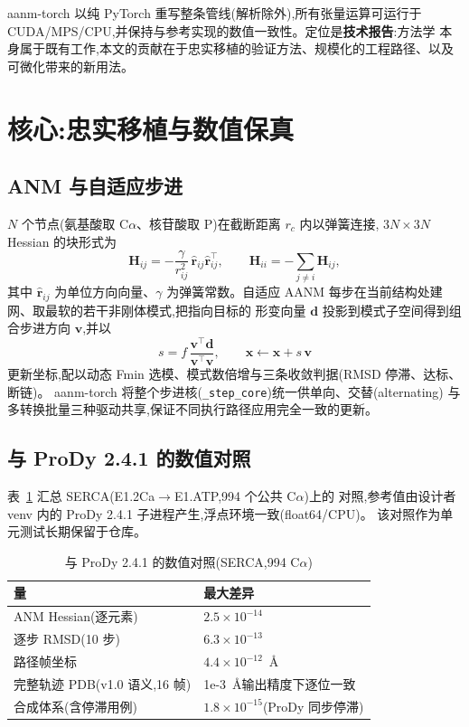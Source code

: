 \documentclass[11pt]{article}
\begin{document}
aanm-torch 以纯 PyTorch 重写整条管线(解析除外),所有张量运算可运行于
CUDA/MPS/CPU,并保持与参考实现的数值一致性。定位是\textbf{技术报告}:方法学
本身属于既有工作,本文的贡献在于忠实移植的验证方法、规模化的工程路径、以及
可微化带来的新用法。

\section{核心:忠实移植与数值保真}
\label{sec:core}

\subsection{ANM 与自适应步进}

$N$ 个节点(氨基酸取 C$\alpha$、核苷酸取 P)在截断距离 $r_c$ 内以弹簧连接,
$3N\times 3N$ Hessian 的块形式为
\begin{equation}
\mathbf{H}_{ij} = -\frac{\gamma}{r_{ij}^2}\,
\hat{\mathbf{r}}_{ij}\hat{\mathbf{r}}_{ij}^{\!\top},
\qquad
\mathbf{H}_{ii} = -\sum_{j\neq i}\mathbf{H}_{ij},
\label{eq:hess}
\end{equation}
其中 $\hat{\mathbf{r}}_{ij}$ 为单位方向向量、$\gamma$ 为弹簧常数。自适应
AANM\cite{yang2009} 每步在当前结构处建网、取最软的若干非刚体模式,把指向目标的
形变向量 $\mathbf{d}$ 投影到模式子空间得到组合步进方向 $\mathbf{v}$,并以
\begin{equation}
s = f\,\frac{\mathbf{v}^{\!\top}\mathbf{d}}{\mathbf{v}^{\!\top}\mathbf{v}},
\qquad \mathbf{x} \leftarrow \mathbf{x} + s\,\mathbf{v}
\label{eq:step}
\end{equation}
更新坐标,配以动态 Fmin 选模、模式数倍增与三条收敛判据(RMSD 停滞、达标、断链)。
aanm-torch 将整个步进核(\texttt{\_step\_core})统一供单向、交替(alternating)
与多转换批量三种驱动共享,保证不同执行路径应用完全一致的更新。

\subsection{与 ProDy 2.4.1 的数值对照}

表~\ref{tab:parity} 汇总 SERCA(E1.2Ca$\to$E1.ATP,994 个公共 C$\alpha$)上的
对照,参考值由设计者 venv 内的 ProDy 2.4.1 子进程产生,浮点环境一致(float64/CPU)。
该对照作为单元测试长期保留于仓库。

\begin{table}[htbp]
\centering
\caption{与 ProDy 2.4.1 的数值对照(SERCA,994 C$\alpha$)}
\label{tab:parity}
\begin{tabularx}{\textwidth}{lX}
\toprule
量 & 最大差异 \\
\midrule
ANM Hessian(逐元素) & $2.5\times10^{-14}$ \\
逐步 RMSD(10 步) & $6.3\times10^{-13}$ \\
路径帧坐标 & $4.4\times10^{-12}$~\AA \\
完整轨迹 PDB(v1.0 语义,16 帧) & 1e-3~\AA 输出精度下逐位一致 \\
合成体系(含停滞用例) & $1.8\times10^{-15}$(ProDy 同步停滞) \\
\bottomrule
\end{tabularx}
\end{table}
\end{document}
